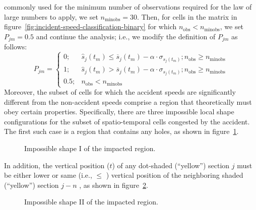 \documentclass[12pt]{report}
\newcommand{\inputTikZ}[1]{%
  }
\newcommand{\inputTikZ}[1]{%
    \beginpgfgraphicnamed{#1-external}%
    \endpgfgraphicnamed%
  }
\begin{document}
commonly used for the minimum number of observations required for the
law of large numbers to apply, we set $n_{\textrm{minobs}} =
30$. Then, for cells in the matrix in
figure~\ref{fig:incident-speed-classification-binary} for which
$n_{\mathrm{obs}} < n_{\textrm{minobs}}$, we set $P_{jm} = 0.5$ and
continue the analysis; i.e., we modify the definition of $P_{jm}$ as
follows:
\begin{equation}
  \label{eq:pjm-final}
  P_{jm} = 
  \begin{cases}
    0;& \hat{s}_j(t_m) \le \overline{s}_j(t_m) - \alpha\cdot\sigma_{s_j(t_m)}; n_{\mathrm{obs}} \ge n_{\textrm{minobs}}\\
    1;& \hat{s}_j(t_m) > \overline{s}_j(t_m) - \alpha\cdot\sigma_{s_j(t_m)}; n_{\mathrm{obs}} \ge n_{\textrm{minobs}}\\
    0.5;& n_{\mathrm{obs}} < n_{\textrm{minobs}}
  \end{cases}
\end{equation}
Moreover, the subset of cells for which the accident speeds are
significantly different from the non-accident speeds comprise a region
that theoretically must obey certain properties. Specifically, there
are three impossible local shape configurations for the subset of
spatio-temporal cells congested by the accident. The first such case
is a region that contains any holes, as shown in
figure~\ref{fig:time-space-incident-schematic-infeasible-1}.
\begin{figure}[t]
  \begin{center}
    \inputTikZ{figs/time-space-incident-schematic-infeasible-1}
    \caption[Impossible shape I of the impacted region]{Impossible shape I of the impacted region.}
    \label{fig:time-space-incident-schematic-infeasible-1}
  \end{center}
\end{figure}
In addition, the vertical position ($t$) of any dot-shaded
(``yellow'') section $j$ must be either lower or same (i.e., $\le$ )
vertical position of the neighboring shaded (``yellow'') section $j -
n$ , as shown in
figure~\ref{fig:time-space-incident-schematic-infeasible-2}.
\begin{figure}[t]
  \begin{center}
    \inputTikZ{figs/time-space-incident-schematic-infeasible-2}
    \caption[Impossible shape II of the impacted region]{Impossible shape II of the impacted region.}
    \label{fig:time-space-incident-schematic-infeasible-2}
  \end{center}
\end{figure}
\end{document}
